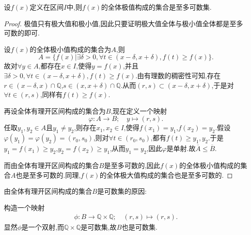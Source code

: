 \documentclass[../../main.tex]{subfiles}%
\begin{document}
\begin{lemma}\label{lemma:R中的极值点集至多可数}
设\(f(x)\)定义在区间\(I\)中,则\(f(x)\)的全体极值构成的集合是至多可数集.
\end{lemma}
\begin{proof}
极值只有极大值和极小值,因此只要证明极大值全体与极小值全体都是至多可数的即可.

设\(f(x)\)的全体极小值构成的集合为\(A\),则
\[
A = \{f(x)|\exists\delta > 0,\forall t\in(x - \delta,x + \delta),f(t)\geqslant f(x)\}.
\]
故对\(\forall y\in A\),都存在\(x\in I\),使得\(y = f(x)\),并且\(\exists\delta > 0,\forall t\in(x - \delta,x + \delta),f(t)\geqslant f(x)\).由有理数的稠密性可知,存在\(r\in(x - \delta,x)\cap\mathbb{Q}\),\(s\in(x,x + \delta)\cap\mathbb{Q}\).从而\((r,s)\subset(x - \delta,x + \delta)\),于是对\(\forall t\in(r,s)\),同样有\(f(t)\geqslant f(x)\).

再设全体有理开区间构成的集合为\(B\),现在定义一个映射
\[
\varphi:A\longrightarrow B;\quad y\longmapsto(r,s).
\]
任取\(y_1,y_2\in A\)且\(y_1\neq y_2\),则存在\(x_1,x_2\in I\),使得\(f(x_1)=y_1\),\(f(x_2)=y_2\).假设\(\varphi(y_1)=\varphi(y_2)=(r_0,s_0)\),则对\(\forall t\in(r_0,s_0)\),都有\(f(t)\geqslant y_1,y_2\).于是\(y_1 = f(x_1)\geqslant y_2\),\(y_2 = f(x_2)\geqslant y_1\),从而\(y_1 = y_2\),因此\(\varphi\)是单射.故$\overline{A}\leqslant \overline{B}.$

而由全体有理开区间构成的集合\(B\)是至多可数的,因此\(f(x)\)的全体极小值构成的集合\(A\)也是至多可数的.同理,\(f(x)\)的全体极大值构成的集合也是至多可数的.
\end{proof}
\begin{remark}
由全体有理开区间构成的集合\(B\)是可数集的原因:

构造一个映射
\begin{align*}
\phi :B\longrightarrow \mathbb{Q} \times \mathbb{Q} ;\quad \left( r,s \right) \longmapsto \left( r,s \right) .
\end{align*}
显然$\phi$是一个双射,而$\mathbb{Q} \times \mathbb{Q}$是可数集,故$B$也是可数集.
\end{remark}
\end{document}
